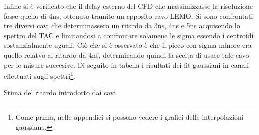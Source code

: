 Infine si è verificato che il delay esterno del CFD che massimizzasse la risoluzione fosse quello di 4ns, ottenuto tramite un apposito cavo LEMO. Si sono confrontati tre diversi cavi
che determinassero un ritardo da 3ns, 4ns e 5ns acquisendo lo spettro del TAC e limitandosi a confrontare solamene le sigma essendo i centroidi sostanzialmente uguali. Ciò che si 
è osservato è che il picco con sigma minore era quello relatvo al ritardo da 4ns, determinando quindi la scelta di usare tale cavo per le misure succesive. Di seguito in tabella
i risultati dei fit gaussiani in canali effettuati sugli spettri\footnote{Come prima, nelle appendici si possono vedere i grafici delle interpolazioni gaussiane.}. \\

\begin{tabella}[h]
	\centering
	
	\caption{Stima del ritardo introdotto dai cavi}
	\label{tab:calib_cavi}
\end{tabella}



